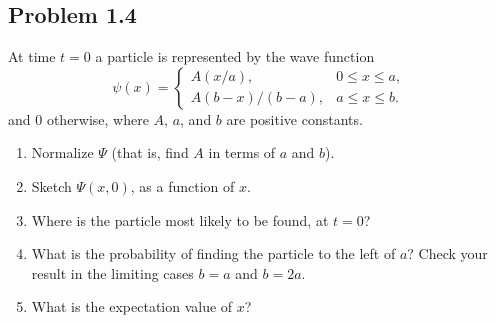 \documentclass[12pt]{exam}
\begin{document}
\begin{solution}
\begin{enumerate}[(a)]
        \begin{minipage}[t]{0.45\textwidth}
          \centering
        \end{minipage}\hfill
        \begin{minipage}[t]{0.48\textwidth}
          \centering
        \end{minipage}

    \end{enumerate}
\end{solution}


\subsection*{Problem 1.4}
At time $t=0$ a particle is represented by the wave function \[
\psi(x)=
\begin{cases}
  A(x/a),            & 0 \le x \le a,\\
  A(b-x)/(b-a),              & a \le x \le b.
\end{cases}
\] 
and $0$ otherwise, where $A$, $a$, and $b$ are positive constants.
\begin{enumerate}
    \item Normalize $\Psi$ (that is, find $A$ in terms of $a$ and $b$).
    \item Sketch $\Psi(x,0)$, as a function of $x$.
    \item Where is the particle most likely to be found, at $t=0$?
    \item What is the probability of finding the particle to the left of $a$? Check your result in the limiting cases $b=a$ and $b=2a$.
    \item What is the expectation value of $x$?
\end{enumerate}
\end{document}
